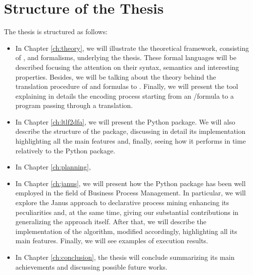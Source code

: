\section{Structure of the Thesis}
The thesis is structured as follows:
\begin{itemize}
\item In Chapter \ref{ch:theory}, we will illustrate the theoretical framework, consisting of \LTL, \LTLf and \PLTL formalisms, underlying the thesis. These formal languages will be described focusing the attention on their syntax, semantics and interesting properties. Besides, we will be talking about the theory behind the translation procedure of \LTLf and \PLTL formulas to \DFAs. Finally, we will present the \MONA tool explaining in details the encoding process starting from an \LTLf/\PLTL formula to a \MONA program passing through a \FOL translation.

\item In Chapter \ref{ch:ltlf2dfa}, we will present the \LTLfToDFA Python package. We will also describe the structure of the package, discussing in detail its implementation highlighting all the main features and, finally, seeing how it performs in time relatively to the \FLLOAT Python package.

\item In Chapter \ref{ch:planning}, 

\item In Chapter \ref{ch:janus}, we will present how the \LTLfToDFA Python package has been well employed in the field of Business Process Management. In particular, we will explore the Janus approach to declarative process mining enhancing its peculiarities and, at the same time, giving our substantial contributions in generalizing the approach itself. After that, we will describe the implementation of the \janus algorithm, modified accordingly, highlighting all its main features. Finally, we will see examples of execution results.

\item In Chapter \ref{ch:conclusion}, the thesis will conclude summarizing its main achievements and discussing possible future works.
\end{itemize}
























